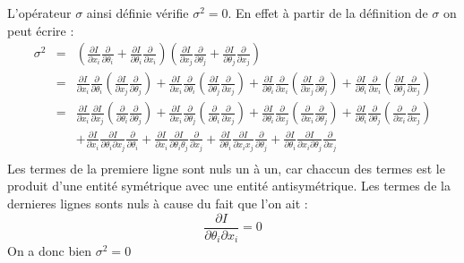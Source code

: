 \documentclass[a4paper,11pt]{article}
\theoremstyle{plain}
\theoremstyle{definition}
\theoremstyle{remark}
\numberwithin{equation}{section}
\numberwithin{equation}{subsection}
\numberwithin{figure}{section}
\begin{document}
\noindent
L'opérateur $\sigma$ ainsi définie vérifie $\sigma^{2}=0$. En effet à partir de la définition de $\sigma$ on peut écrire :
\begin{eqnarray*}
 \sigma^2 &=& \left( \frac{\partial I}{\partial x_{i}} \frac{\partial}{\partial \theta_{i}} + 
\frac{\partial I}{\partial \theta_{i}} \frac{\partial}{\partial x_{i}} \right)
\left( \frac{\partial I}{\partial x_{j}} \frac{\partial}{\partial \theta_{j}}  + 
\frac{\partial I}{\partial \theta_{j}} \frac{\partial}{\partial x_{j}} \right)\\
          &=& \frac{\partial I}{\partial x_{i}} \frac{\partial}{\partial \theta_{i}} 
\left( \frac{\partial I}{\partial x_{j}} \frac{\partial}{\partial \theta_{j}} \right) 
    + \frac{\partial I}{\partial x_{i}} \frac{\partial}{\partial \theta_{i}} 
\left( \frac{\partial I}{\partial \theta_{j}} \frac{\partial}{\partial x_{j}} \right)
    + \frac{\partial I}{\partial \theta_{i}} \frac{\partial}{\partial x_{i}} 
\left( \frac{\partial I}{\partial x_{j}} \frac{\partial}{\partial \theta_{j}} \right)
    + \frac{\partial I}{\partial \theta_{i}} \frac{\partial}{\partial x_{i}} 
\left( \frac{\partial I}{\partial \theta_{j}} \frac{\partial}{\partial x_{j}} \right)\\
          &=& \frac{\partial I}{\partial x_{i}} \frac{\partial I}{\partial x_{j}}  
\left( \frac{\partial }{\partial \theta_{i}} \frac{\partial}{\partial \theta_{j}} \right)  
    + \frac{\partial I}{\partial x_{i}} \frac{\partial}{\partial \theta_{j}} 
\left( \frac{\partial }{\partial \theta_{i}} \frac{\partial}{\partial x_{j}} \right)
    + \frac{\partial I}{\partial \theta_{i}} \frac{\partial}{\partial x_{j}} 
\left( \frac{\partial }{\partial x_{i}} \frac{\partial}{\partial \theta_{j}} \right)
    + \frac{\partial I}{\partial \theta_{i}} \frac{\partial}{\partial \theta_{j}} 
\left( \frac{\partial }{\partial x_{i}} \frac{\partial}{\partial x_{j}} \right)\\
    && + \frac{\partial I}{\partial x_{i}} \frac{\partial I}{\partial \theta_{i} \partial x_{j}} 
\frac{\partial}{\partial \theta_{i}}
    + \frac{\partial I}{\partial x_{i}} \frac{\partial I}{\partial \theta_{i} \theta_{j}}
\frac{\partial}{\partial x_{j}}
    + \frac{\partial I}{\partial \theta_{i}} \frac{\partial I}{\partial x_{i} x_{j}}
\frac{\partial}{\partial \theta_{j}}
    + \frac{\partial I}{\partial \theta_{i}} \frac{\partial I}{\partial x_{i} \partial \theta_{j}}
\frac{\partial}{\partial x_{j}} \\
\end{eqnarray*}
Les termes de la premiere ligne sont nuls un à un, car chaccun des termes est le produit d'une entité symétrique avec une entité antisymétrique.
Les termes de la dernieres lignes sonts nuls à cause du fait que l'on ait : 
\begin{equation}
 \frac{\partial I}{\partial \theta_{i} \partial x_{i}} = 0
\end{equation}
On a donc bien $\sigma^{2}=0$\\
\end{document}
